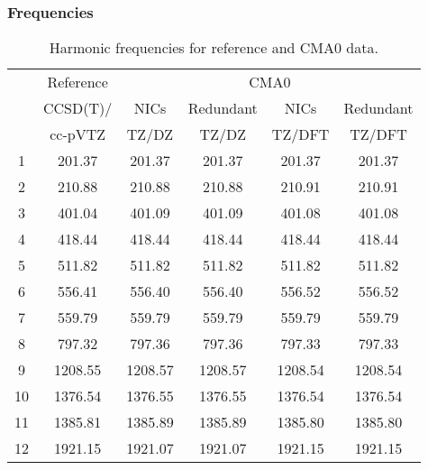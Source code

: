 \documentclass[10pt,oneside]{article}
\begin{document}
\begin{table}[h!]
\subsubsection*{Frequencies}
\centering
\caption{Harmonic frequencies for reference and CMA0 data.}
\begin{tabular}{cccccc}
\toprule
{} & Reference & \multicolumn{4}{c}{CMA0} \\
{} &  CCSD(T)/ &    NICs &  Redundant &    NICs & Redundant \\
{} &   cc-pVTZ &   TZ/DZ &      TZ/DZ &  TZ/DFT &    TZ/DFT \\
\midrule
1  &    201.37 &  201.37 &     201.37 &  201.37 &    201.37 \\
2  &    210.88 &  210.88 &     210.88 &  210.91 &    210.91 \\
3  &    401.04 &  401.09 &     401.09 &  401.08 &    401.08 \\
4  &    418.44 &  418.44 &     418.44 &  418.44 &    418.44 \\
5  &    511.82 &  511.82 &     511.82 &  511.82 &    511.82 \\
6  &    556.41 &  556.40 &     556.40 &  556.52 &    556.52 \\
7  &    559.79 &  559.79 &     559.79 &  559.79 &    559.79 \\
8  &    797.32 &  797.36 &     797.36 &  797.33 &    797.33 \\
9  &   1208.55 & 1208.57 &    1208.57 & 1208.54 &   1208.54 \\
10 &   1376.54 & 1376.55 &    1376.55 & 1376.54 &   1376.54 \\
11 &   1385.81 & 1385.89 &    1385.89 & 1385.80 &   1385.80 \\
12 &   1921.15 & 1921.07 &    1921.07 & 1921.15 &   1921.15 \\
\bottomrule
\end{tabular}
\end{table}
\end{document}
